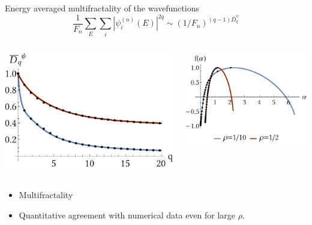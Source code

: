 \documentclass[xcolor=x11names,compress,professionalfonts]{beamer}
\renewcommand{\(}{\begin{columns}}
\renewcommand{\)}{\end{columns}}
\newcommand{\<}[1]{\begin{column}{#1}}
\renewcommand{\>}{\end{column}}
\begin{document}
\begin{frame}{Energy averaged multifractality of the wavefunctions}
\[ 
	\frac{1}{F_n} \sum_E \sum_i |\psi_i^{(n)}(E)|^{2q}  \sim (1/F_n)^{(q-1)\bar{D}_q^\psi}
\]
\begin{columns}
	\begin{column}{5cm}
		\centering
		\includegraphics[scale=.4]{dq_av.pdf}
	\end{column}
	\begin{column}{5cm}
		\centering
		\includegraphics[scale=.6]{falpha_av.pdf}
	\end{column}
\end{columns}
		\begin{itemize}
			\item Multifractality
			\item Quantitative agreement with numerical data even for large $\rho$.
		\end{itemize}

\end{frame}
\end{document}
